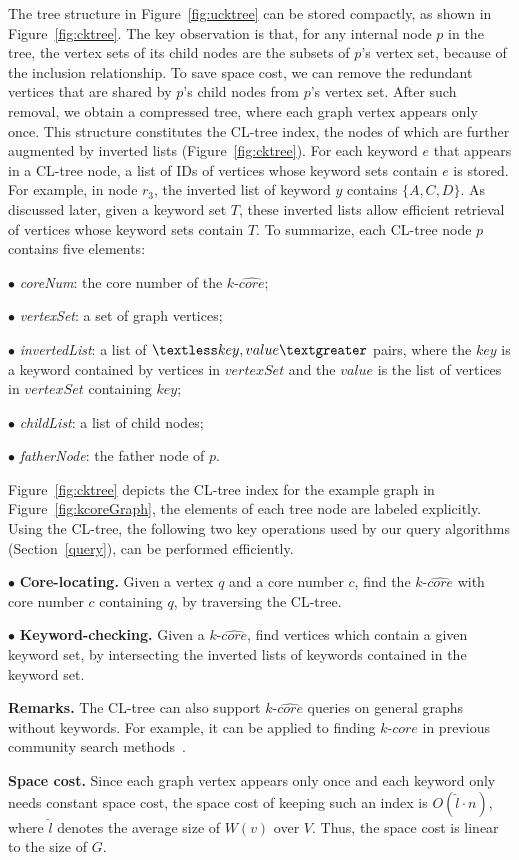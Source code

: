 The tree structure in Figure~\ref{fig:ucktree} can be stored compactly, as shown in Figure~\ref{fig:cktree}.
The key observation is that, for any internal node $p$ in the tree,
the vertex sets of its child nodes are the subsets of $p$'s vertex set,
because of the inclusion relationship. To save space cost,
we can remove the redundant vertices that are shared by $p$'s child nodes from $p$'s vertex set.
After such removal, we obtain a compressed tree,
where each graph vertex appears only once.
This structure constitutes the CL-tree index, the nodes of which are further augmented by inverted lists (Figure~\ref{fig:cktree}).
For each keyword $e$ that appears in a CL-tree node, a list of IDs of vertices whose keyword sets contain $e$ is stored.  For example, in node $r_3$, the inverted list of keyword $y$ contains $\{A,C,D\}$. As discussed later, given a keyword set $T$, these inverted lists allow efficient retrieval of vertices whose keyword sets contain $T$.
To summarize, each CL-tree node $p$ contains five elements:

$\bullet$ \emph{coreNum}: the core number of the $k$-$\widehat {core}$;

$\bullet$ \emph{vertexSet}: a set of graph vertices;

$\bullet$ \emph{invertedList}: a list of $\textless key,value\textgreater$ pairs, where the $key$ is a keyword contained by vertices in $vertexSet$ and the $value$ is the list of vertices in $vertexSet$ containing $key$;

$\bullet$ \emph{childList}: a list of child nodes;

$\bullet$ \emph{fatherNode}: the father node of $p$.

Figure~\ref{fig:cktree} depicts the CL-tree index for the example graph in Figure~\ref{fig:kcoreGraph},
the elements of each tree node are labeled explicitly.
Using the CL-tree, the following two key operations used by our query algorithms (Section~\ref{query}), can be performed efficiently.

$\bullet$ {\bf{Core-locating.}} Given a vertex $q$ and a core number $c$,
	find the $k$-$\widehat {core}$ with core number $c$ containing $q$,
	by traversing the CL-tree.
	
$\bullet$ {\bf{Keyword-checking.}} Given a $k$-$\widehat {core}$, find vertices which contain a given keyword set, by intersecting the inverted lists of keywords contained in the keyword set.


\textbf{Remarks.}
The CL-tree can also support $k$-$\widehat {core}$ queries on general graphs without keywords.
For example, it can be applied to finding $k$-$\widehat{core}$ in previous community search methods~\cite{KDD2010}.


\textbf{Space cost.}
Since each graph vertex appears only once and each keyword only needs constant space cost,
the space cost of keeping such an index is $O({\widehat l}\cdot n)$,
where $\widehat l$ denotes the average size of $W(v)$ over $V$.
Thus, the space cost is linear to the size of $G$. 